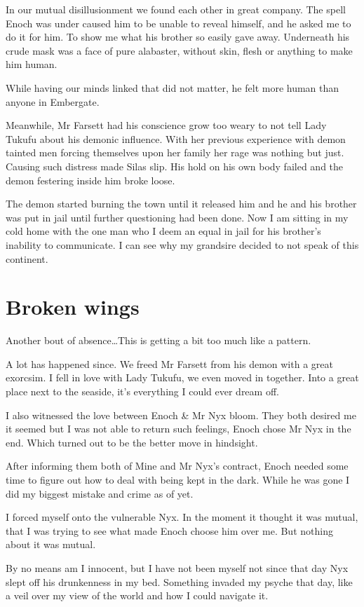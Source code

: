 \documentclass{article}
\begin{document}
In our mutual disillusionment we found each other in great company. The spell Enoch was under caused him to be unable to reveal himself, and he asked me to do it for him. To show me what his brother so easily gave away. Underneath his crude mask was a face of pure alabaster, without skin, flesh or anything to make him human. 

While having our minds linked that did not matter, he felt more human than anyone in Embergate. 

Meanwhile, Mr Farsett had his conscience grow too weary to not tell Lady Tukufu about his demonic influence. With her previous experience with demon tainted men forcing themselves upon her family her rage was nothing but just. Causing such distress made Silas slip. His hold on his own body failed and the demon festering inside him broke loose.

The demon started burning the town until it released him and he and his brother was put in jail until further questioning had been done. Now I am sitting in my cold home with the one man who I deem an equal in jail for his brother's inability to communicate. I can see why my grandsire decided to not speak of this continent.

\section*{Broken wings}

Another bout of absence\dots This is getting a bit too much like a pattern. 

A lot has happened since. We freed Mr Farsett from his demon with a great exorcsim. I fell in love with Lady Tukufu, we even moved in together. Into a great place next to the seaside, it's everything I could ever dream off. 

I also witnessed the love between Enoch \& Mr Nyx bloom. They both desired me it seemed but I was not able to return such feelings, Enoch chose Mr Nyx in the end. Which turned out to be the better move in hindsight.

After informing them both of Mine and Mr Nyx's contract, Enoch needed some time to figure out how to deal with being kept in the dark. While he was gone I did my biggest mistake and crime as of yet.

I forced myself onto the vulnerable Nyx. In the moment it thought it was mutual, that I was trying to see what made Enoch choose him over me. But nothing about it was mutual.

By no means am I innocent, but I have not been myself not since that day Nyx slept off his drunkenness in my bed. Something invaded my psyche that day, like a veil over my view of the world and how I could navigate it.
\end{document}
